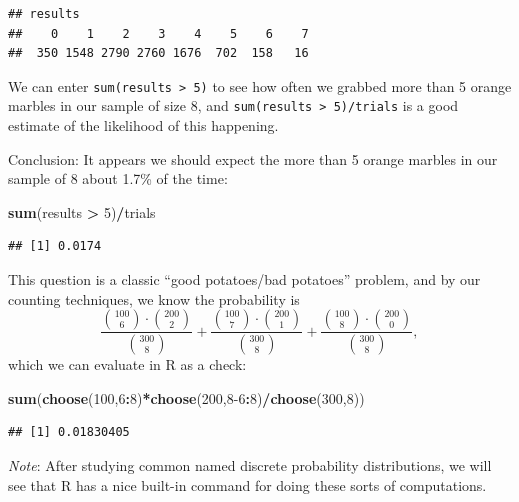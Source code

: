 \documentclass[
]{book}
\newenvironment{Shaded}{\begin{snugshade}}{\end{snugshade}}
\newcommand{\DecValTok}[1]{\textcolor[rgb]{0.00,0.00,0.81}{#1}}
\newcommand{\FunctionTok}[1]{\textcolor[rgb]{0.13,0.29,0.53}{\textbf{#1}}}
\newcommand{\NormalTok}[1]{#1}
\newcommand{\SpecialCharTok}[1]{\textcolor[rgb]{0.81,0.36,0.00}{\textbf{#1}}}
\theoremstyle{definition}
\theoremstyle{definition}
\theoremstyle{definition}
\theoremstyle{definition}
\theoremstyle{remark}
\begin{document}
\begin{verbatim}
## results
##    0    1    2    3    4    5    6    7 
##  350 1548 2790 2760 1676  702  158   16
\end{verbatim}

We can enter \texttt{sum(results\ \textgreater{}\ 5)} to see how often we grabbed more than 5 orange marbles in our sample of size 8, and \texttt{sum(results\ \textgreater{}\ 5)/trials} is a good estimate of the likelihood of this happening.

Conclusion: It appears we should expect the more than 5 orange marbles in our sample of 8 about 1.7\% of the time:

\begin{Shaded}
\begin{Highlighting}[]
\FunctionTok{sum}\NormalTok{(results }\SpecialCharTok{\textgreater{}} \DecValTok{5}\NormalTok{)}\SpecialCharTok{/}\NormalTok{trials}
\end{Highlighting}
\end{Shaded}

\begin{verbatim}
## [1] 0.0174
\end{verbatim}

This question is a classic ``good potatoes/bad potatoes'' problem, and by our counting techniques, we know the probability is \[\frac{\binom{100}{6}\cdot\binom{200}{2}}{\binom{300}{8}}+
\frac{\binom{100}{7}\cdot\binom{200}{1}}{\binom{300}{8}}+
\frac{\binom{100}{8}\cdot\binom{200}{0}}{\binom{300}{8}},\]
which we can evaluate in R as a check:

\begin{Shaded}
\begin{Highlighting}[]
\FunctionTok{sum}\NormalTok{(}\FunctionTok{choose}\NormalTok{(}\DecValTok{100}\NormalTok{,}\DecValTok{6}\SpecialCharTok{:}\DecValTok{8}\NormalTok{)}\SpecialCharTok{*}\FunctionTok{choose}\NormalTok{(}\DecValTok{200}\NormalTok{,}\DecValTok{8{-}6}\SpecialCharTok{:}\DecValTok{8}\NormalTok{)}\SpecialCharTok{/}\FunctionTok{choose}\NormalTok{(}\DecValTok{300}\NormalTok{,}\DecValTok{8}\NormalTok{))}
\end{Highlighting}
\end{Shaded}

\begin{verbatim}
## [1] 0.01830405
\end{verbatim}

\emph{Note}: After studying common named discrete probability distributions, we will see that R has a nice built-in command for doing these sorts of computations.
\end{document}
